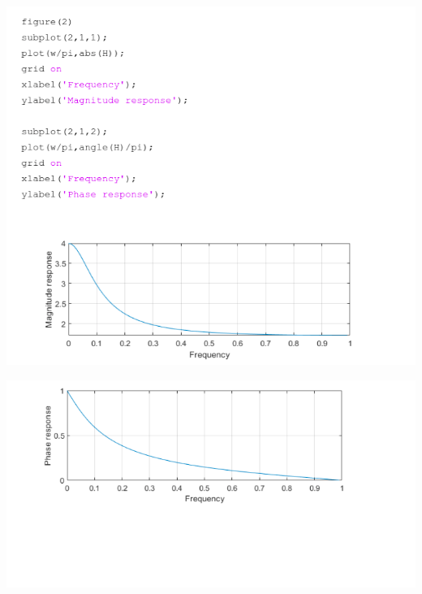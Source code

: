 \documentclass[a4paper]{article}
\begin{document}
	\begin{center}
		\includegraphics[width=1\linewidth]{screenshot052}
	\end{center}
	
	\begin{center}
		\includegraphics[width=1\linewidth]{screenshot053}
	\end{center}
	
	
\newpage

	
\end{document}
